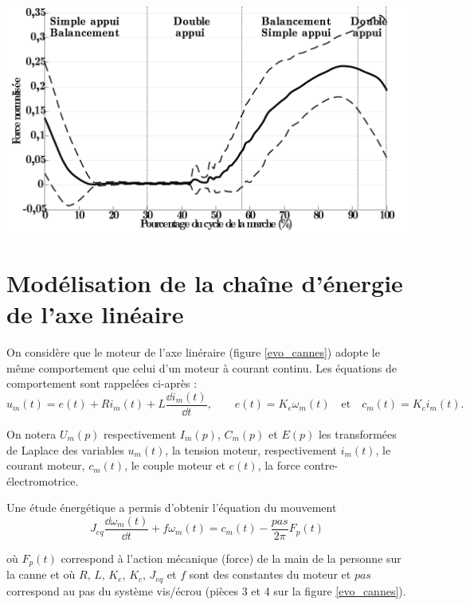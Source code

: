 \begin{center}
\begin{minipage}{0.48\linewidth}
\includegraphics[width=\linewidth]{img/fig7}
\end{minipage}
\end{center}

\section{Modélisation de la chaîne d'énergie de l'axe linéaire}

On considère que le moteur de l'axe linéraire (figure \ref{evo_cannes}) adopte le même comportement que celui d'un moteur à courant continu. Les équations de comportement sont rappelées ci-après :
\[u_m(t)=e(t)+ R i_m(t)+L\dfrac{\dd i_m(t)}{\dd t}, \qquad e(t)=K_e \omega_m(t) \quad \textrm{et} \quad c_m(t)=K_c i_m(t).\]

On notera $U_m(p)$ respectivement $I_m(p)$, $C_m(p)$ et $E(p)$ les transformées de Laplace des variables $u_m(t)$, la tension moteur, respectivement $i_m(t)$, le courant moteur, $c_m(t)$, le couple moteur et $e(t)$, la force contre-électromotrice.

Une étude énergétique a permis d'obtenir l'équation du mouvement \[J_{eq} \dfrac{\dd \omega_m(t)}{\dd t}+ f \omega_m(t)=c_m(t) - \dfrac{pas}{2\pi} F_p(t)\]

où $F_p(t)$ correspond à l'action mécanique (force) de la main de la personne sur la canne et où $R$, $L$, $K_e$, $K_c$, $J_{eq}$ et $f$ sont des constantes du moteur et $pas$ correspond au pas du système vis/écrou (pièces 3 et 4 sur la figure \ref{evo_cannes}).



